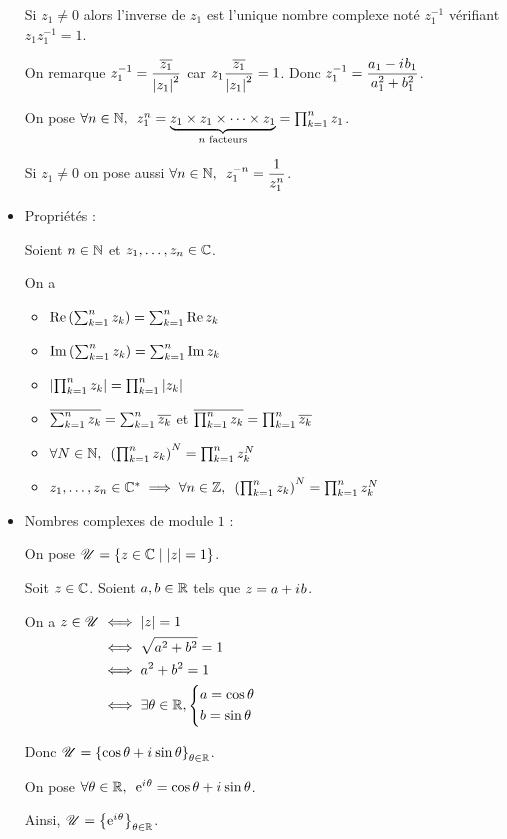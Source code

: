 \begin{rappel}
\begin{itemize}
Si \(z_1\not=0\) alors l'inverse de \(z_1\) est l'unique nombre complexe noté \(z_1^{-1}\) vérifiant \(z_1z_1^{-1}=1\).

On remarque \(z_1^{-1}=\dfrac{\overline{z_1}}{\left\lvert z_1\right\rvert^2}\) car \(z_1\dfrac{\overline{z_1}}{\left\lvert z_1\right\rvert^2}=1\). Donc \(z_1^{-1}=\dfrac{a_1-i\mkern1mu b_1}{a_1^2+b_1^2}\).

On pose \(\quantifs{\forall n\in\N}z_1^n=\underbrace{z_1\times z_1\times\dots\times z_1}_\text{$n$ facteurs}=\prod_{k=1}^nz_1\).

Si \(z_1\not=0\) on pose aussi \(\quantifs{\forall n\in\N}z_1^{-n}=\dfrac{1}{z_1^n}\).

\item Propriétés :

Soient \(n\in\mathbb{N}\) et \(z_1,\dots,z_n\in\mathbb{C}\).

On a \begin{itemize}
\item \(\operatorname{Re}\left(\sum_{k=1}^nz_k\right)=\sum_{k=1}^{n}\operatorname{Re} z_k\)

\item \(\operatorname{Im}\left(\sum_{k=1}^nz_k\right)=\sum_{k=1}^{n}\operatorname{Im} z_k\)

\item \(\left\lvert\prod_{k=1}^nz_k\right\rvert=\prod_{k=1}^n\left\lvert z_k\right\rvert\)

\item \(\overline{\sum_{k=1}^nz_k}=\sum_{k=1}^n\overline{z_k}\) et \(\overline{\prod_{k=1}^nz_k}=\prod_{k=1}^n\overline{z_k}\)

\item \(\quantifs{\forall N\in\N}\paren{\prod_{k=1}^nz_k}^N=\prod_{k=1}^nz_k^N\)

\item \(z_1,\dots,z_n\in\Cs\imp\quantifs{\forall n\in\Z}\paren{\prod_{k=1}^nz_k}^N=\prod_{k=1}^nz_k^N\)
\end{itemize}

\item Nombres complexes de module \(1\) :

On pose \(\mathscr{U}=\left\lbrace z\in\mathbb{C}\;\middle|\;\left\lvert z\right\rvert=1\right\rbrace\).

Soit \(z\in\mathbb{C}\). Soient \(a,b\in\mathbb{R}\) tels que \(z=a+i\mkern1mu b\).

On a \(\begin{aligned}[t]
z\in\mathscr{U}&\iff\left\lvert z\right\rvert=1 \\
&\iff\sqrt{a^2+b^2}=1 \\
&\iff a^2+b^2=1 \\
&\iff\exists\theta\in\mathbb{R},\begin{dcases}a=\cos\theta \\ b=\sin\theta\end{dcases}
\end{aligned}\)

Donc \(\mathscr{U}=\left\lbrace\cos\theta+i\mkern1mu\sin\theta\right\rbrace_{\theta\in\mathbb{R}}\).

On pose \(\quantifs{\forall\theta\in\R}\e{\i\theta}=\cos\theta+\i\sin\theta\).

Ainsi, \(\mathscr{U}=\left\lbrace\mathrm{e}^{i\mkern1mu\theta}\right\rbrace_{\theta\in\mathbb{R}}\).
\end{itemize}
\end{rappel}

